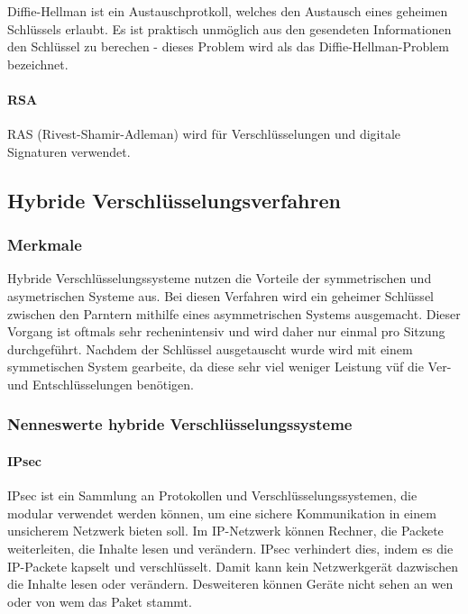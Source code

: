 \documentclass[12pt,a4paper]{report}
\begin{document}
Diffie-Hellman ist ein Austauschprotkoll, welches den Austausch eines geheimen Schlüssels erlaubt. Es ist praktisch unmöglich aus den gesendeten Informationen den Schlüssel zu berechen - dieses Problem wird als das Diffie-Hellman-Problem bezeichnet.

\paragraph{RSA}

RAS (Rivest-Shamir-Adleman) wird für Verschlüsselungen und digitale Signaturen verwendet.

\subsection{Hybride Verschlüsselungsverfahren}

\subsubsection{Merkmale}

Hybride Verschlüsselungssysteme nutzen die Vorteile der symmetrischen und asymetrischen Systeme aus. Bei diesen Verfahren wird ein geheimer Schlüssel zwischen den Parntern mithilfe eines asymmetrischen Systems ausgemacht. Dieser Vorgang ist oftmals sehr rechenintensiv und wird daher nur einmal pro Sitzung durchgeführt. Nachdem der Schlüssel ausgetauscht wurde wird mit einem symmetischen System gearbeite, da diese sehr viel weniger Leistung vüf die Ver- und Entschlüsselungen benötigen.

\subsubsection{Nenneswerte hybride Verschlüsselungssysteme}

\paragraph{IPsec}

IPsec ist ein Sammlung an Protokollen und Verschlüsselungssystemen, die modular verwendet werden können, um eine sichere Kommunikation in einem unsicherem Netzwerk bieten soll. Im IP-Netzwerk können Rechner, die Packete weiterleiten, die Inhalte lesen und verändern. IPsec verhindert dies, indem es die IP-Packete kapselt und verschlüsselt. Damit kann kein Netzwerkgerät dazwischen die Inhalte lesen oder verändern. Desweiteren können Geräte nicht sehen an wen oder von wem das Paket stammt.
\end{document}
